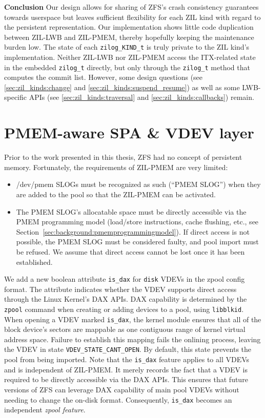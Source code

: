 \documentclass[12pt,a4paper,twoside]{book}
\begin{document}
{\textbf{Conclusion}
Our design allows for sharing of ZFS's crash consistency guarantees towards userspace but leaves sufficient flexibility for each ZIL kind with regard to the persistent representation.
Our implementation shows little code duplication between ZIL-LWB and ZIL-PMEM, thereby hopefully keeping the maintenance burden low.
The state of each \lstinline{zilog_KIND_t} is truly private to the ZIL kind's implementation.
Neither ZIL-LWB nor ZIL-PMEM access the ITX-related state in the embedded \lstinline{zilog_t} directly, but only through the \lstinline{zilog_t} method that computes the commit list.
However, some design questions (see \ref{sec:zil_kinds:change} and \ref{sec:zil_kinds:suspend_resume}) as well as some LWB-specific APIs (see \ref{sec:zil_kinds:traversal} and \ref{sec:zil_kinds:callbacks}) remain.

\section{PMEM-aware SPA \& VDEV layer}\label{sec:pmemspavdev}
Prior to the work presented in this thesis, ZFS had no concept of persistent memory.
Fortunately, the requirements of ZIL-PMEM are very limited:
\begin{itemize}[noitemsep]
    \item /dev/pmem SLOGs must be recognized as such (``PMEM SLOG'') when they are added to the pool so that the ZIL-PMEM can be activated.
    \item The PMEM SLOG's allocatable space must be directly accessible via the PMEM programming model (load/store instructions, cache flushing, etc., see Section~\ref{sec:background:pmemprogrammingmodel}).
        If direct access is not possible, the PMEM SLOG must be considered faulty, and pool import must be refused.
        We assume that direct access cannot be lost once it has been established.
\end{itemize}

We add a new boolean attribute \lstinline{is_dax} for \lstinline{disk} VDEVs in the zpool config format.
The attribute indicates whether the VDEV supports direct access through the Linux Kernel's DAX APIs.
DAX capability is determined by the \lstinline{zpool} command when creating or adding devices to a pool, using \lstinline{libblkid}.
When opening a VDEV marked \lstinline{is_dax}, the kernel module ensures that all of the block device's sectors are mappable as one contiguous range of kernel virtual address space.
Failure to establish this mapping fails the onlining process, leaving the VDEV in state \lstinline{VDEV_STATE_CANT_OPEN}.
By default, this state prevents the pool from being imported.
Note that the \lstinline{is_dax} feature applies to all VDEVs and is independent of ZIL-PMEM.
It merely records the fact that a VDEV is required to be directly accessible via the DAX APIs.
This ensures that future versions of ZFS can leverage DAX capability of main pool VDEVs without needing to change the on-disk format.
Consequently, \lstinline{is_dax} becomes an independent \textit{zpool feature}.

}
\end{document}
